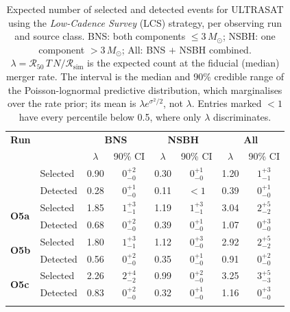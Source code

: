 \begin{table}
\renewcommand\arraystretch{1.3}
\setlength{\tabcolsep}{0.3cm}
\centering
\caption{Expected number of selected and detected events for ULTRASAT using the \emph{Low-Cadence Survey} (LCS) strategy, per observing run and source class. BNS: both components $\leq 3\,M_\odot$; NSBH: one component $> 3\,M_\odot$; All: BNS $+$ NSBH combined. $\lambda = \mathcal{R}_{50}\,T\,N / \mathcal{R}_{\mathrm{sim}}$ is the expected count at the fiducial (median) merger rate. The interval is the median and 90\% credible range of the Poisson-lognormal predictive distribution, which marginalises over the rate prior; its mean is $\lambda e^{\sigma^2/2}$, not $\lambda$. Entries marked $<1$ have every percentile below 0.5, where only $\lambda$ discriminates.}
\label{tab:ultrasat-non-overlap-selected-detected-1yr}
\begin{tabular}{llcccccc}
\Xhline{3\arrayrulewidth}
\textbf{Run} & & \multicolumn{2}{c}{\textbf{BNS}} & \multicolumn{2}{c}{\textbf{NSBH}} & \multicolumn{2}{c}{\textbf{All}} \\
 & & $\lambda$ & 90\% CI & $\lambda$ & 90\% CI & $\lambda$ & 90\% CI \\
\Xhline{3\arrayrulewidth}
\multirow{2}{*}{\textbf{IR1HLV}} & Selected & 0.90 & $0^{+2}_{-0}$ & 0.30 & $0^{+1}_{-0}$ & 1.20 & $1^{+3}_{-1}$ \\
 & Detected & 0.28 & $0^{+1}_{-0}$ & 0.11 & $<1$ & 0.39 & $0^{+1}_{-0}$ \\
\hline
\multirow{2}{*}{\textbf{O5a}} & Selected & 1.85 & $1^{+3}_{-1}$ & 1.19 & $1^{+3}_{-1}$ & 3.04 & $2^{+5}_{-2}$ \\
 & Detected & 0.68 & $0^{+2}_{-0}$ & 0.39 & $0^{+1}_{-0}$ & 1.07 & $0^{+3}_{-0}$ \\
\hline
\multirow{2}{*}{\textbf{O5b}} & Selected & 1.80 & $1^{+3}_{-1}$ & 1.12 & $0^{+3}_{-0}$ & 2.92 & $2^{+5}_{-2}$ \\
 & Detected & 0.56 & $0^{+2}_{-0}$ & 0.35 & $0^{+1}_{-0}$ & 0.91 & $0^{+2}_{-0}$ \\
\hline
\multirow{2}{*}{\textbf{O5c}} & Selected & 2.26 & $2^{+4}_{-2}$ & 0.99 & $0^{+2}_{-0}$ & 3.25 & $3^{+5}_{-3}$ \\
 & Detected & 0.83 & $0^{+2}_{-0}$ & 0.32 & $0^{+1}_{-0}$ & 1.16 & $0^{+3}_{-0}$ \\
\Xhline{3\arrayrulewidth}
\end{tabular}
\end{table}
